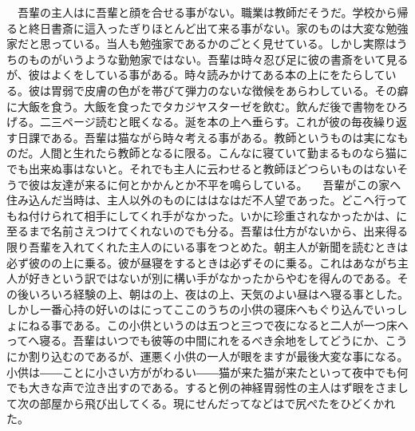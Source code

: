 \documentclass[a5j]{ltjtbook}
\begin{document}
　吾輩の主人はに吾輩と顔を合せる事がない。職業は教師だそうだ。学校から帰ると終日書斎に這入ったぎりほとんど出て来る事がない。家のものは大変な勉強家だと思っている。当人も勉強家であるかのごとく見せている。しかし実際はうちのものがいうような勤勉家ではない。吾輩は時々忍び足に彼の書斎をいて見るが、彼はよくをしている事がある。時々読みかけてある本の上にをたらしている。彼は胃弱で皮膚の色がを帯びて弾力のないな徴候をあらわしている。その癖に大飯を食う。大飯を食ったでタカジヤスターゼを飲む。飲んだ後で書物をひろげる。二三ページ読むと眠くなる。涎を本の上へ垂らす。これが彼の毎夜繰り返す日課である。吾輩は猫ながら時々考える事がある。教師というものは実になものだ。人間と生れたら教師となるに限る。こんなに寝ていて勤まるものなら猫にでも出来ぬ事はないと。それでも主人に云わせると教師ほどつらいものはないそうで彼は友達が来るに何とかかんとか不平を鳴らしている。 \newline
　吾輩がこの家へ住み込んだ当時は、主人以外のものにははなはだ不人望であった。どこへ行ってもね付けられて相手にしてくれ手がなかった。いかに珍重されなかったかは、に至るまで名前さえつけてくれないのでも分る。吾輩は仕方がないから、出来得る限り吾輩を入れてくれた主人のにいる事をつとめた。朝主人が新聞を読むときは必ず彼のの上に乗る。彼が昼寝をするときは必ずそのに乗る。これはあながち主人が好きという訳ではないが別に構い手がなかったからやむを得んのである。その後いろいろ経験の上、朝はの上、夜はの上、天気のよい昼はへ寝る事とした。しかし一番心持の好いのはにってここのうちの小供の寝床へもぐり込んでいっしょにねる事である。この小供というのは五つと三つで夜になると二人が一つ床へってへ寝る。吾輩はいつでも彼等の中間にれをるべき余地をしてどうにか、こうにか割り込むのであるが、運悪く小供の一人が眼をますが最後大変な事になる。小供は――ことに小さい方ががわるい――猫が来た猫が来たといって夜中でも何でも大きな声で泣き出すのである。すると例の神経胃弱性の主人はず眼をさまして次の部屋から飛び出してくる。現にせんだってなどはで尻ぺたをひどくかれた。 \newline
\end{document}
